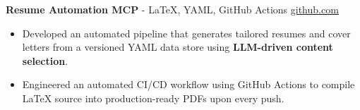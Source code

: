 \documentclass[11pt]{article}
\begin{document}

\textbf{Resume Automation MCP}{ - LaTeX, YAML, GitHub Actions} \hfill \href{https://github.com/Monica20030707/Tex_OrangeLeaf-mcp}{github.com} \\
\vspace{-9pt}
\begin{itemize}
  \item Developed an automated pipeline that generates tailored resumes and cover letters from a versioned YAML data store using \textbf{LLM-driven content selection}.
  \item Engineered an automated CI/CD workflow using GitHub Actions to compile LaTeX source into production-ready PDFs upon every push.
\end{itemize}
\end{document}

